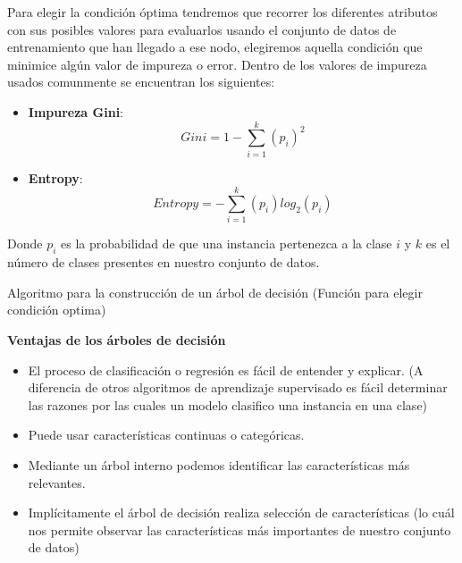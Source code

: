 \documentclass[11pt,fleqn]{book} %
\begin{document}
Para elegir la condición óptima tendremos que recorrer los diferentes atributos con sus posibles valores para evaluarlos usando el conjunto de datos de entrenamiento que han llegado a ese nodo, elegiremos aquella condición que minimice algún valor de impureza o error. Dentro de los valores de impureza usados comunmente se encuentran los siguientes:

\begin{itemize}
\item \textbf{Impureza Gini}: 
\begin{equation}
Gini = 1 - \sum_{i=1}^{k}(p_i)^{2}
\end{equation}
\item \textbf{Entropy}: 
\begin{equation}
Entropy = - \sum_{i=1}^{k}(p_i)log_2(p_i)
\end{equation}
\end{itemize}
Donde $p_i$ es la probabilidad de que una instancia pertenezca a la clase $i$ y $k$ es el número de clases presentes en nuestro conjunto de datos.
\begin{algorithm}
  \DontPrintSemicolon
  
  \;

  \caption{Algoritmo para la construcción de un árbol de decisión (Función para elegir condición optima)}
\end{algorithm}
\FloatBarrier

\textbf{Ventajas de los árboles de decisión}

\begin{itemize}
\item El proceso de clasificación o regresión es fácil de entender y explicar. (A diferencia de otros algoritmos de aprendizaje supervisado es fácil determinar las razones por las cuales un modelo clasifico una instancia en una clase)
\item Puede usar características continuas o categóricas.
\item Mediante un árbol interno podemos identificar las características más relevantes. 
\item Implícitamente el árbol de decisión realiza selección de características (lo cuál nos permite observar las características más importantes de nuestro conjunto de datos)
\end{itemize}
\end{document}
